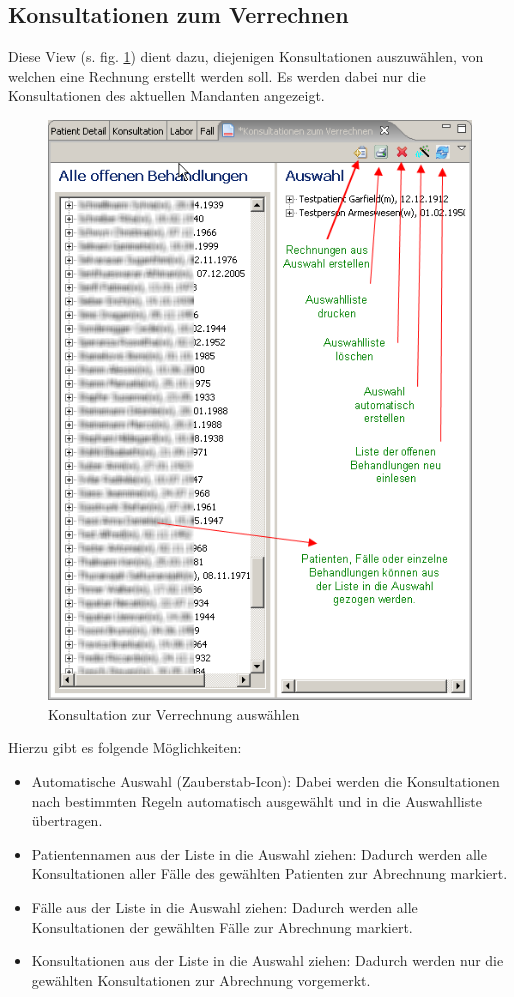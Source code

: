 \subsection{Konsultationen zum Verrechnen}
 Diese View (s. fig. \ref{fig:konsv}) dient dazu, diejenigen
Konsultationen
auszuwählen, von welchen eine Rechnung erstellt werden soll. Es werden dabei nur
die Konsultationen des aktuellen Mandanten angezeigt.
\begin{figure}[hb]
\includegraphics{images/konsv}
\caption{Konsultation zur Verrechnung auswählen}
\label {fig:konsv}
\end{figure}
Hierzu gibt es folgende Möglichkeiten:
\begin{itemize}
  \item Automatische Auswahl (Zauberstab-Icon): Dabei werden die Konsultationen nach bestimmten Regeln automatisch ausgewählt und in die Auswahlliste
  übertragen.
  \item Patientennamen aus der Liste in die Auswahl ziehen: Dadurch werden alle
  Konsultationen aller Fälle des gewählten Patienten zur Abrechnung markiert.
  \item Fälle aus der Liste in die Auswahl ziehen: Dadurch werden alle
  Konsultationen der gewählten Fälle zur Abrechnung markiert.
  \item Konsultationen aus der Liste in die Auswahl ziehen: Dadurch werden nur
  die gewählten Konsultationen zur Abrechnung vorgemerkt.
\end{itemize}
